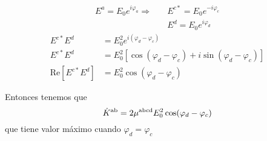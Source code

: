 \documentclass{article}
\begin{document}
\begin{align}
E^{a} = E_{0}e^{i \varphi_{a}} \Rightarrow
& \quad E^{c*} = E_{0}e^{-i \varphi_{c}}  \nonumber \\
& \quad E^{d} = E_{0}e^{i \varphi_{d}} 
\end{align}
\begin{align}
E^{c*}E^{d} &= E^{2}_{0} e^{i(\varphi_{d} - \varphi_{c})} \nonumber \\
E^{c*}E^{d} &= E^{2}_{0} [\cos(\varphi_{d} - \varphi_{c}) + 
i\sin (\varphi_{d} - \varphi_{c}) ] \nonumber \\
\mathrm{Re}[E^{c*}E^{d}] &= E^{2}_{0} \cos(\varphi_{d} - \varphi_{c})
\end{align}

Entonces tenemos que 
\begin{equation}
\dot K^{\mathrm{a}\mathrm{b}} = 2 \mu^{\mathrm{abcd}} E^{2}_{0} \cos(\varphi_{d} - \varphi_{c})
\end{equation}
que tiene valor m\'aximo cuando $\varphi_{d} = \varphi_{c}$



{}
\end{document}
